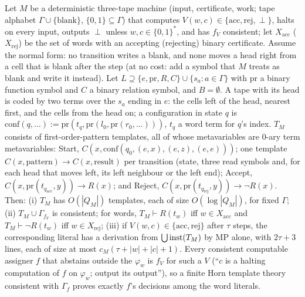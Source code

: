 \begin{proposition}\label{prop:time:horn}
Let $M$ be a deterministic three-tape machine (input, certificate, work; tape alphabet $\Gamma\cup\{\text{blank}\}$, $\{0,1\}\subseteq\Gamma$) that computes $V(w,c)\in\{\mathrm{acc},\mathrm{rej},\perp\}$, halts on every input, outputs $\perp$ unless $w,c\in\{0,1\}^*$, and has $f_V$ consistent; let $X_{\mathrm{acc}}$ ($X_{\mathrm{rej}}$) be the set of words with an accepting (rejecting) binary certificate. Assume the normal form: no transition writes a blank, and none moves a head right from a cell that is blank after the step (at no cost: add a symbol that $M$ treats as blank and write it instead). Let $L\supseteq\{e,\mathrm{pr},R,C\}\cup\{s_a:a\in\Gamma\}$ with $\mathrm{pr}$ a binary function symbol and $C$ a binary relation symbol, and $B=\emptyset$. A tape with its head is coded by two terms over the $s_a$ ending in $e$: the cells left of the head, nearest first, and the cells from the head on; a configuration in state $q$ is $\mathrm{conf}(q,\dots):=\mathrm{pr}(t_q,\mathrm{pr}(l_0,\mathrm{pr}(r_0,\dots)))$, $t_q$ a word term for $q$'s index. $T_M$ consists of first-order-pattern templates, all of whose metavariables are $0$-ary term metavariables: Start, $C(x,\mathrm{conf}(q_0,(e,x),(e,z),(e,e)))$; one template $C(x,\text{pattern})\to C(x,\text{result})$ per transition (state, three read symbols and, for each head that moves left, its left neighbour or the left end); Accept, $C(x,\mathrm{pr}(t_{q_{\mathrm{acc}}},y))\to R(x)$; and Reject, $C(x,\mathrm{pr}(t_{q_{\mathrm{rej}}},y))\to\neg R(x)$. Then:
(i) $T_M$ has $O(|Q_M|)$ templates, each of size $O(\log|Q_M|)$, for fixed $\Gamma$;
(ii) $T_M\cup\Gamma_{f_V}$ is consistent; for words, $T_M\vdash R(t_w)$ iff $w\in X_{\mathrm{acc}}$ and $T_M\vdash\neg R(t_w)$ iff $w\in X_{\mathrm{rej}}$;
(iii) if $V(w,c)\in\{\mathrm{acc},\mathrm{rej}\}$ after $\tau$ steps, the corresponding literal has a derivation from $\bigcup\mathrm{inst}(T_M)$ by MP alone, with $2\tau+3$ lines, each of size at most $c_M(\tau+|w|+|c|+1)$.
Every consistent computable assigner $f$ that abstains outside the $\varphi_w$ is $f_V$ for such a $V$ (``$c$ is a halting computation of $f$ on $\varphi_w$; output its output''), so a finite Horn template theory consistent with $\Gamma_f$ proves exactly $f$'s decisions among the word literals.
\end{proposition}

